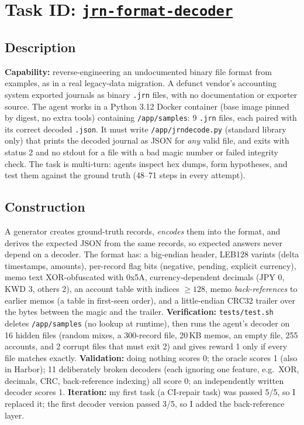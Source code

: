 \documentclass[11pt]{article}
\begin{document}
\small
\setlength{\parskip}{2pt}

\section*{Task ID: \underline{\texttt{jrn-format-decoder}}}
\vspace{-6pt}

\subsection*{Description}
\vspace{-3pt}
\textbf{Capability:} reverse-engineering an undocumented binary file format from examples, as in a real legacy-data migration.
A defunct vendor's accounting system exported journals as binary \texttt{.jrn} files, with no documentation or exporter source.
The agent works in a Python 3.12 Docker container (base image pinned by digest, no extra tools) containing \texttt{/app/samples}:
9 \texttt{.jrn} files, each paired with its correct decoded \texttt{.json}. It must write \texttt{/app/jrndecode.py} (standard library only)
that prints the decoded journal as JSON for \emph{any} valid file, and exits with status 2 and no stdout for a file with a bad magic number or failed
integrity check. The task is multi-turn: agents inspect hex dumps, form hypotheses, and test them against the ground truth (48--71 steps in every attempt).

\subsection*{Construction}
\vspace{-3pt}
A generator creates ground-truth records, \emph{encodes} them into the format, and derives the expected JSON from the same records, so expected answers never depend on a decoder.
The format has: a big-endian header, LEB128 varints (delta timestamps, amounts), per-record flag bits (negative, pending, explicit currency),
memo text XOR-obfuscated with 0x5A, currency-dependent decimals (JPY 0, KWD 3, others 2), an account table with indices $\ge128$,
memo \emph{back-references} to earlier memos (a table in first-seen order), and a little-endian CRC32 trailer over the bytes between the magic and the trailer.
\textbf{Verification:} \texttt{tests/test.sh} deletes \texttt{/app/samples} (no lookup at runtime), then runs the agent's decoder on 16 hidden files
(random mixes, a 300-record file, 20\,KB memos, an empty file, 255 accounts, and 2 corrupt files that must exit 2) and gives reward 1 only if every file matches exactly.
\textbf{Validation:} doing nothing scores 0; the oracle scores 1 (also in Harbor); 11 deliberately broken decoders (each ignoring one feature, e.g.\ XOR, decimals, CRC, back-reference indexing) all score 0;
an independently written decoder scores 1. \textbf{Iteration:} my first task (a CI-repair task) was passed 5/5, so I replaced it; the first decoder version passed 3/5, so I added the back-reference layer.
\end{document}
